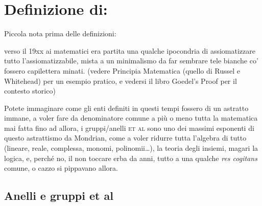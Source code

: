 \documentclass[11pt]{article}
\date{\today}
\title{}
\begin{document}
\tableofcontents

\section{Definizione di:}
\label{sec:org5b0a8aa}
Piccola nota prima delle definizioni:

verso il 19xx ai matematici era partita una qualche ipocondria di
assiomatizzare tutto l'assiomatizzabile, mista a un minimalismo da far
sembrare tele bianche co' fossero capilettera minati.
(vedere Principia Matematica (quello di Russel e Whitehead) per un
esempio pratico, e vedersi il libro Goedel's Proof per il contesto
storico)

Potete immaginare come gli enti definiti in questi tempi fossero di un
astratto immane, a voler fare da denominatore comune a più o meno
tutta la matematica mai fatta fino ad allora, i gruppi/anelli
\textsc{et al} sono uno dei massimi esponenti di questo astrattismo da
Mondrian, come a voler ridurre tutta l'algebra di tutto (lineare,
reale, complessa, monomi, polinomii\ldots{}), la teoria degli insiemi,
magari la logica, e, perché no, il non toccare erba da anni, tutto a
una qualche \emph{res cogitans} comune, o cazzo si pippavano allora.

\subsection{Anelli e gruppi et al}
\label{sec:orgae7eebb}
\end{document}
